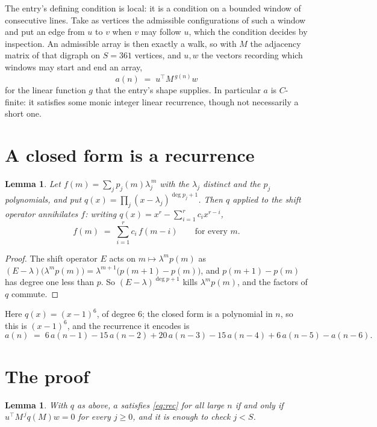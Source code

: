 \documentclass[11pt,a4paper]{article}
\theoremstyle{plain}
\newtheorem{lemma}[theorem]{Lemma}
\theoremstyle{definition}
\begin{document}
The entry's defining condition is local: it is a condition on a bounded window of consecutive lines. Take as vertices the
admissible configurations of such a window and put an edge from $u$ to $v$ when $v$ may
follow $u$, which the condition decides by inspection. An admissible array is then exactly a
walk, so with $M$ the adjacency matrix of that digraph on $S=361$ vertices, and $u,w$ the
vectors recording which windows may start and end an array,
\[
a(n)\;=\;u^{\!\top}M^{\,g(n)}w
\]
for the linear function $g$ that the entry's shape supplies. In particular $a$ is
$C$-finite: it satisfies some monic integer linear recurrence, though not necessarily a short
one.

\section{A closed form is a recurrence}

\begin{lemma}\label{lem:ann}
Let $f(m)=\sum_{j}p_j(m)\lambda_j^{\,m}$ with the $\lambda_j$ distinct and the $p_j$
polynomials, and put $q(x)=\prod_j(x-\lambda_j)^{\deg p_j+1}$. Then $q$ applied to the shift
operator annihilates $f$: writing $q(x)=x^{r}-\sum_{i=1}^{r}c_ix^{r-i}$,
\[
f(m)\;=\;\sum_{i=1}^{r}c_i\,f(m-i)\qquad\text{for every }m.
\]
\end{lemma}

\begin{proof}
The shift operator $E$ acts on $m\mapsto\lambda^{m}p(m)$ as
$(E-\lambda)\bigl(\lambda^{m}p(m)\bigr)=\lambda^{m+1}\bigl(p(m+1)-p(m)\bigr)$, and
$p(m+1)-p(m)$ has degree one less than $p$. So $(E-\lambda)^{\deg p+1}$ kills
$\lambda^{m}p(m)$, and the factors of $q$ commute.
\end{proof}

Here $q(x)=(x-1)^{6}$, of degree $6$; the closed form is a polynomial in $n$, so this is $(x-1)^{6}$, and the recurrence it encodes is
\begin{equation}\label{eq:rec}
a(n)\;=\;6\,a(n-1) - 15\,a(n-2) + 20\,a(n-3) - 15\,a(n-4) + 6\,a(n-5) - a(n-6).
\end{equation}

\section{The proof}

\begin{lemma}\label{lem:crit}
With $q$ as above, $a$ satisfies \eqref{eq:rec} for all large $n$ if and only if
$u^{\!\top}M^{\,j}q(M)w=0$ for every $j\ge0$, and it is enough to check $j<S$.
\end{lemma}
\end{document}
